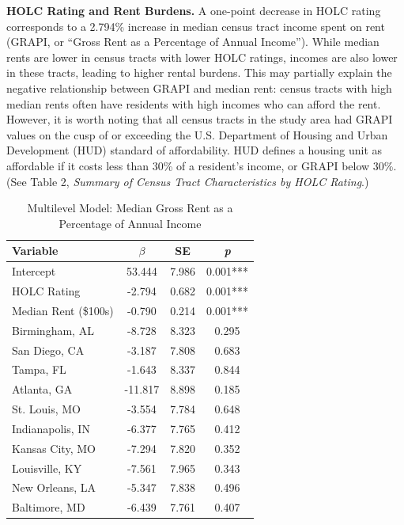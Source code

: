 \documentclass[paper=letter, fontsize=12pt]{scrartcl} %
\begin{document}
	\begin{table}
		\textbf{HOLC Rating and Rent Burdens.} A one-point decrease in HOLC rating corresponds to a 2.794\% increase in median census tract income spent on rent (GRAPI, or ``Gross Rent as a Percentage of Annual Income''). While median rents are lower in census tracts with lower HOLC ratings, incomes are also lower in these tracts, leading to higher rental burdens. This may partially explain the negative relationship between GRAPI and median rent: census tracts with high median rents often have residents with high incomes who can afford the rent. However, it is worth noting that all census tracts in the study area had GRAPI values on the cusp of or exceeding the U.S. Department of Housing and Urban Development (HUD) standard of affordability. HUD defines a housing unit as affordable if it costs less than 30\% of a resident's income, or GRAPI below 30\%. (See Table 2, \textit{Summary of Census Tract Characteristics by HOLC Rating}.)
		\caption{Multilevel Model: Median Gross Rent as a Percentage of Annual Income}
		\begin{center}
			\begin{tabular}{|| l | c c c ||}
				\hline
				Variable & $\beta$ & SE & \textit{p} \\
				\hline \hline
				Intercept & 	53.444	 & 	7.986	 & 	0.001***	\\ 
				\hline 
				HOLC Rating & 	-2.794	 & 	0.682	 & 	0.001***	\\ 
				\hline 
				Median Rent (\$100s) & 	-0.790	 & 	0.214	 & 	0.001***	\\ 
				\hline 
				Birmingham, AL & 	-8.728	 & 	8.323	 & 	0.295	\\ 
				\hline 
				San Diego, CA & 	-3.187	 & 	7.808	 & 	0.683	\\ 
				\hline 
				Tampa, FL & 	-1.643	 & 	8.337	 & 	0.844	\\ 
				\hline 
				Atlanta, GA & 	-11.817	 & 	8.898	 & 	0.185	\\ 
				\hline 
				St. Louis, MO & 	-3.554	 & 	7.784	 & 	0.648	\\ 
				\hline 
				Indianapolis, IN & 	-6.377	 & 	7.765	 & 	0.412	\\ 
				\hline 
				Kansas City, MO & 	-7.294	 & 	7.820	 & 	0.352	\\ 
				\hline 
				Louisville, KY & 	-7.561	 & 	7.965	 & 	0.343	\\ 
				\hline 
				New Orleans, LA & 	-5.347	 & 	7.838	 & 	0.496	\\ 
				\hline 
				Baltimore, MD & 	-6.439	 & 	7.761	 & 	0.407	\\ 

\end{tabular}
\end{center}
\end{table}
\end{document}
